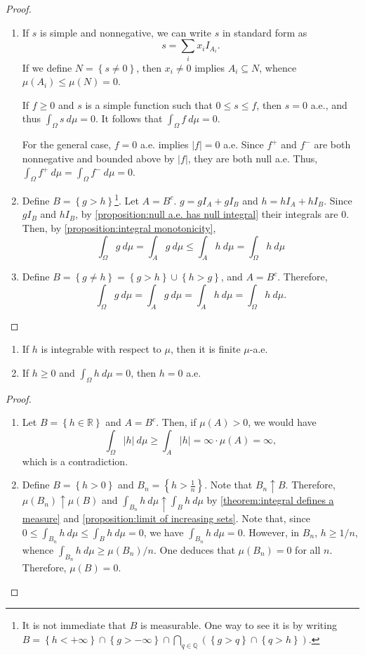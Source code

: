 \begin{proof}
	\begin{enumerate}
		\item If \(s\) is simple and nonnegative, we can write \(s\) in standard form as
\[
		s=\sum_{i}{x_iI_{A_i}}
.\] If we define
\(N=\left\{s\neq 0\right\}\), then \(x_i\neq0\) implies
\(A_i\subseteq N\), whence \(\mu(A_i)\leq\mu(N)=0\).
		
		If \(f\geq0\) and \(s\) is a simple function such that \(0\leq s\leq f\), then
\(s=0\) a.e., and thus \(\int_{\Omega}s~d\mu=0\). It follows that
\(\int_{\Omega}f~d\mu=0\).
		
		For the general case, \(f=0\) a.e. implies \(|f|=0\) a.e. Since \(f^+\)
and \(f^-\) are both nonnegative and bounded above by \(|f|\), they are both
null a.e. Thus, \(\int_{\Omega}f^+~d\mu=\int_{\Omega}f^-~d\mu=0\).
\item Define \(B=\left\{g>h\right\}\)\footnote{It is not immediate that \(B\) is measurable. One way to see it is by writing \(B=\left\{h<+\infty\right\}\cap\left\{g>-\infty\right\}\cap\bigcap_{q\in \mathbb{Q}}\left(\left\{g>q\right\}\cap\left\{q>h\right\}\right)\).}. Let \(A=B^{c}\).
\(g=gI_{A}+gI_{B}\) and \(h=hI_{A}+hI_{B}\). Since \(gI_{B}\) and \(hI_{B}\), by
\ref{proposition:null a.e. has null integral} their integrals are \(0\). Then,
by \cref{proposition:integral monotonicity},
		\[ \int_{\Omega}g~d\mu=\int_{A}g~d\mu\leq\int_{A}h~d\mu=\int_{\Omega}h~d\mu
		\]
		
		
\item Define \(B=\left\{g\neq h\right\}=\left\{g>h\right\}\cup\left\{h>g\right\}\), and \(A=B^c\). Therefore,
		\[
				\int_{\Omega}g~d\mu=\int_{A}g~d\mu=\int_{A}h~d\mu=\int_{\Omega}h~d\mu
		.\]
	\end{enumerate}
\end{proof}
\begin{prop}
	\begin{enumerate}
		\item If \(h\) is integrable with respect to \(\mu\), then it is finite
\(\mu\)-a.e.
		\item If \(h\geq0\) and \(\int_{\Omega}h~d\mu=0\), then \(h=0\) a.e.
	\end{enumerate}
\end{prop}
\begin{proof}
		\begin{enumerate}
			\item Let \(B=\left\{h\in\mathbb{R}\right\}\) and \(A=B^c\). Then, if \(\mu(A)>0\), we would have
			\[\int_{\Omega}|h|~d\mu\geq\int_{A}|h|=\infty\cdot\mu(A)=\infty,\]
which is a contradiction.
			\item Define \(B=\left\{h>0\right\}\) and
\(B_n=\left\{h>\frac{1}{n}\right\}\). Note that
\(B_n\uparrow B\). Therefore, \(\mu(B_n)\uparrow\mu(B)\) and
\(\int_{B_n}h~d\mu\uparrow\int_{B}h~d\mu\) by \cref{theorem:integral defines a
measure} and \cref{proposition:limit of increasing sets}.	Note that,
since \(0\leq\int_{B_n}h~d\mu\leq\int_{B}h~d\mu=0\), we have
\(\int_{B_n}h~d\mu=0\). However, in \(B_n\), \(h\geq 1/n\), whence
\(\int_{B_n}h~d\mu\geq \mu(B_n)/n\). One deduces that \(\mu(B_n)=0\) for all
\(n\). Therefore, \(\mu(B)=0.\)
		\end{enumerate}
\end{proof}
